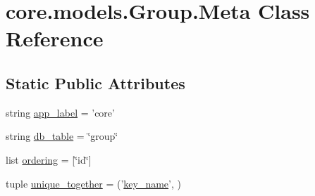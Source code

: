 \hypertarget{classcore_1_1models_1_1Group_1_1Meta}{\section{core.\-models.\-Group.\-Meta Class Reference}
\label{classcore_1_1models_1_1Group_1_1Meta}
}
\subsection*{Static Public Attributes}
\begin{DoxyCompactItemize}
\item 
string \hyperlink{classcore_1_1models_1_1Group_1_1Meta_a76147e00b0c352dd0b1d2322fdc53468}{app\-\_\-label} = 'core'
\item 
string \hyperlink{classcore_1_1models_1_1Group_1_1Meta_a6ff4edbed9d157ad060f934f2f135caf}{db\-\_\-table} = \char`\"{}group\char`\"{}
\item 
list \hyperlink{classcore_1_1models_1_1Group_1_1Meta_a0fa267be3302702571fa7b38d521d112}{ordering} = \mbox{[}\char`\"{}id\char`\"{}\mbox{]}
\item 
tuple \hyperlink{classcore_1_1models_1_1Group_1_1Meta_a915ea69536ed8dcaad1d1703e474dfac}{unique\-\_\-together} = ('\hyperlink{classcore_1_1models_1_1Group_a0e455bf93e8ef057105e84940632e65e}{key\-\_\-name}', )
\end{DoxyCompactItemize}


